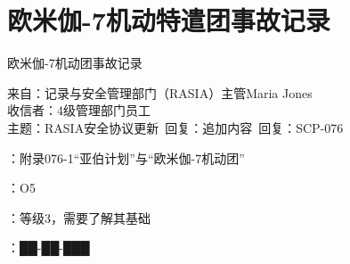 \section{欧米伽-7机动特遣团事故记录}

\label{sec:DOC-scp-076-2}

欧米伽-7机动团事故记录

\begin{scpbox}

来自：记录与安全管理部门（RASIA）主管Maria Jones\\
收信者：4级管理部门员工\\
主题：RASIA安全协议更新\ 回复：追加内容\ 回复：SCP-076

：附录076-1“亚伯计划”与“欧米伽-7机动团”

：O5

：等级3，需要了解其基础

：██-██-███

\end{scpbox}

\hr



